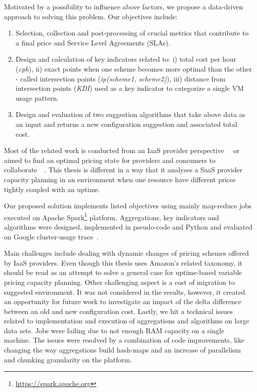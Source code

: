 \documentclass[]{final_report}
\begin{document}
Motivated by a possibility to influence above factors, we propose a data-driven approach to solving this problem. Our objectives include:
\begin{enumerate}
\item Selection, collection and post-processing of crucial metrics that contribute to a final price and Service Level Agreements (SLAs).
\item Design and calculation of key indicators related to: i) total cost per hour (\textit{cph}), ii) exact points when one scheme becomes more optimal than the other - called intersection points (\textit{ip(scheme1, scheme2)}), iii) distance from intersection points (\textit{KDI}) used as a key indicator to categorize a single VM usage pattern.
\item Design and evaluation of two suggestion algorithms that take above data as an input and returns a new configuration suggestion and associated total cost.
\end{enumerate}


Most of the related work is conducted from an IaaS provider perspective~\cite{6274129}~\cite{6253563} or aimed to find an optimal pricing state for providers and consumers to collaborate~\cite{6676685}~\cite{6963393}. This thesis is different in a way that it analyses a SaaS provider capacity planning in an environment when one resource have different prices tightly coupled with an uptime.


Our proposed solution implements listed objectives using mainly map-reduce jobs executed on Apache Spark\footnote{\url{https://spark.apache.org}} platform. Aggregations, key indicators and algorithms were designed, implemented in pseudo-code and Python and evaluated on Google cluster-usage trace~\cite{clusterdata:Reiss2011}. 


Main challenges include dealing with dynamic changes of pricing schemes offered by IaaS providers. Even though this thesis uses Amazon's related taxonomy, it should be read as an attempt to solve a general case for uptime-based variable pricing capacity planning. Other challenging aspect is a cost of migration to suggested environment. It was not considered in the results, however, it created an opportunity for future work to investigate an impact of the delta difference between an old and new configuration cost. Lastly, we hit a technical issues related to implementation and execution of aggregations and algorithms on large data sets. Jobs were failing due to not enough RAM capacity on a single machine. The issues were resolved by a combination of code improvements, like changing the way aggregations build hash-maps and an increase of parallelism and chunking granularity on the platform.
\end{document}
